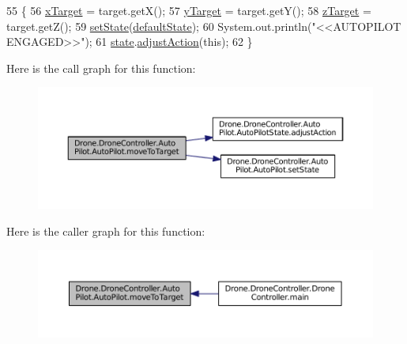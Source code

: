 \begin{DoxyCode}
55     \{
56         \hyperlink{class_drone_1_1_drone_controller_1_1_auto_pilot_1_1_auto_pilot_a7dac3f41e1f2053306c9f1ee1f52f4d3}{xTarget} = target.getX();
57         \hyperlink{class_drone_1_1_drone_controller_1_1_auto_pilot_1_1_auto_pilot_a2b12dc818a6868850498f3626bdfd62f}{yTarget} = target.getY();
58         \hyperlink{class_drone_1_1_drone_controller_1_1_auto_pilot_1_1_auto_pilot_a35b8ee5b8a76195dcb7804ec2d6e9f8f}{zTarget} = target.getZ();
59         \hyperlink{class_drone_1_1_drone_controller_1_1_auto_pilot_1_1_auto_pilot_a387d070b622e6a18883eca218826740b}{setState}(\hyperlink{class_drone_1_1_drone_controller_1_1_auto_pilot_1_1_auto_pilot_ade2467dd822e41b4543f86a5298184d7}{defaultState});
60         System.out.println(\textcolor{stringliteral}{"<<AUTOPILOT ENGAGED>>"});
61         \hyperlink{class_drone_1_1_drone_controller_1_1_auto_pilot_1_1_auto_pilot_aeddcac2f0c541e42b2d1034e7d2c6ea0}{state}.\hyperlink{interface_drone_1_1_drone_controller_1_1_auto_pilot_1_1_auto_pilot_state_ae6fb0ba699d26333d2800f02bd6d1a33}{adjustAction}(\textcolor{keyword}{this});
62     \}
\end{DoxyCode}


Here is the call graph for this function\+:\nopagebreak
\begin{figure}[H]
\begin{center}
\leavevmode
\includegraphics[width=350pt]{class_drone_1_1_drone_controller_1_1_auto_pilot_1_1_auto_pilot_a9e5590bf12eec7180152284aa40c3338_cgraph}
\end{center}
\end{figure}




Here is the caller graph for this function\+:\nopagebreak
\begin{figure}[H]
\begin{center}
\leavevmode
\includegraphics[width=350pt]{class_drone_1_1_drone_controller_1_1_auto_pilot_1_1_auto_pilot_a9e5590bf12eec7180152284aa40c3338_icgraph}
\end{center}
\end{figure}


